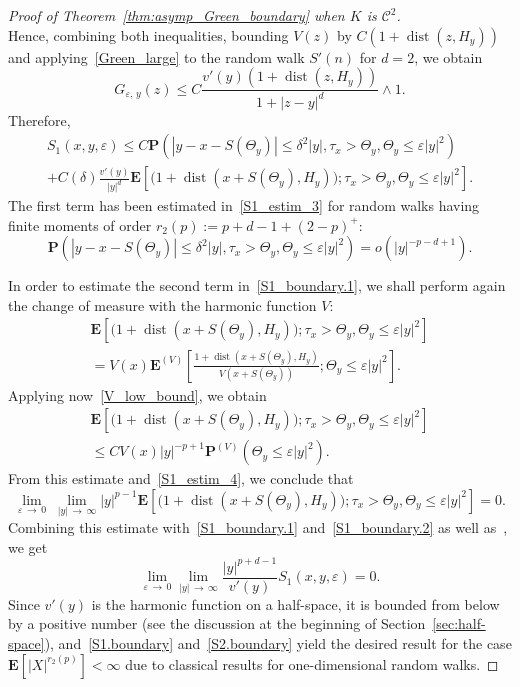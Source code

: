 \documentclass[10pt]{amsart}
\theoremstyle{definition}\newtheorem{defi}[theo]{Definition}\newtheorem{rema}[theo]{Remark}\newtheorem{exam}[theo]{Example}\newtheorem{exem}[theo]{Example}\newtheorem{nota}[theo]{Notation}
\DeclareMathOperator{\dist}{dist}
\newcommand{\clC}{\mathcal{C}}
\newcommand{\pr}{\mathbf{P}}
\newcommand{\e}{\mathbf{E}}
\renewcommand{\le}{\leqslant}
\renewcommand{\leq}{\leqslant}
\begin{document}
\begin{proof}[Proof of Theorem~\ref{thm:asymp_Green_boundary} when $K$ is $\clC^{2}$]
\[\]
Hence, combining both inequalities, bounding $V(z)$ by $C(1+\dist(z,H_y))$ and applying~\eqref{Green_large} to the random walk $S'(n)$ for $d=2$, we obtain
\[
G_{\varepsilon,\,y}(z)\leq C\frac{v'(y)\left(1+\dist(z,H_y)\right)}{1+|z-y|^d}\wedge1.
\]
Therefore,
\begin{multline}\label{S1_boundary.1}
S_1(x,y,\varepsilon)
\le C\pr\left(\left|y-x-S(\Theta_y)\right|\le\delta^2|y|,\tau_x>\Theta_y,\Theta_y\le\varepsilon|y|^2\right)\\
+C(\delta)\frac{v'(y)}{|y|^d}\e\left[\big(1+\dist\left(x+S\left(\Theta_y\right),H_y\right)\big);
\tau_x>\Theta_y,\Theta_y\le\varepsilon|y|^2\right].
\end{multline}
The first term has been estimated in~\eqref{S1_estim_3} for random walks having finite moments of order $r_2(p):=p+d-1+(2-p)^+$:
\begin{equation}\label{S1_boundary.2}
\pr\left(\left|y-x-S\left(\Theta_y\right)\right|\le\delta^2|y|,\tau_x>\Theta_y,\Theta_y\le\varepsilon|y|^2\right) =o\left(|y|^{-p-d+1}\right).
\end{equation}

In order to estimate the second term in~\eqref{S1_boundary.1}, we shall perform again the change of measure with the harmonic function $V$:
\begin{multline*}
\e\left[\big(1+\dist\left(x+S\left(\Theta_y\right),H_y\right)\big);\tau_x>\Theta_y,\Theta_y\le\varepsilon|y|^2\right]\\
=V(x)\e^{(V)}\left[\frac{1+\dist\left(x+S\left(\Theta_y\right),H_y\right)}{V\left(x+S\left(\Theta_y\right)\right)};
\Theta_y\le\varepsilon|y|^2\right].
\end{multline*}
Applying now~\eqref{V_low_bound}, we obtain
\begin{multline*}
\e\left[\big(1+\dist\left(x+S\left(\Theta_y\right),H_y\right)\big);\tau_x>\Theta_y,\Theta_y\le\varepsilon|y|^2\right]\\
\le CV(x)|y|^{-p+1}\pr^{(V)}\left(\Theta_y\le\varepsilon|y|^2\right).
\end{multline*}
From this estimate and~\eqref{S1_estim_4}, we conclude that
\[
\lim_{\varepsilon\,\to\,0}\;\lim_{|y|\,\to\,\infty}|y|^{p-1}
\e\left[\big(1+\dist\left(x+S\left(\Theta_y\right),H_y\right)\big);\tau_x>\Theta_y,\Theta_y\le\varepsilon|y|^2\right]=0.
\]
Combining this estimate with~\eqref{S1_boundary.1} and~\eqref{S1_boundary.2} as well as~\cite[Lemma~13]{DeWa-15}, we get
\begin{equation}\label{S1.boundary}
\lim_{\varepsilon\,\to\,0}\lim_{|y|\,\to\,\infty}
\frac{|y|^{p+d-1}}{v'(y)}S_1(x,y,\varepsilon)=0.
\end{equation}
Since $v'(y)$ is the harmonic function on a half-space, it is bounded from below by a positive number (see the discussion at the beginning of Section~\ref{sec:half-space}), and~\eqref{S1.boundary} and~\eqref{S2.boundary} yield the desired result for the case $\e[|X|^{r_2(p)}]<\infty$ due to classical results for one-dimensional random walks.


\end{proof}
\end{document}
